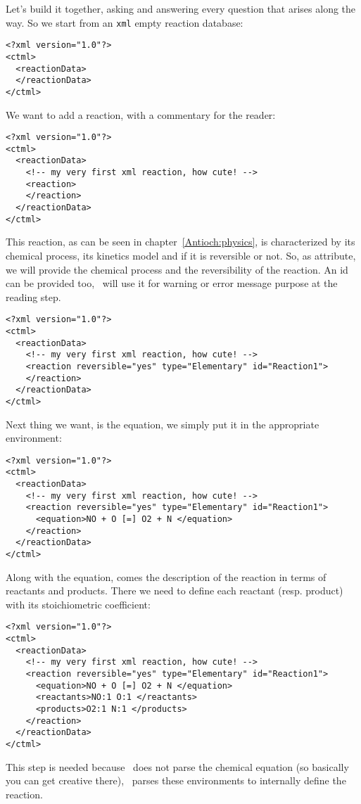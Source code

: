 Let's build it together, asking and answering every question that
arises along the way.
So we start from an \verb!xml! empty reaction database:
%
\begin{verbatim}
<?xml version="1.0"?>
<ctml>
  <reactionData>
  </reactionData>
</ctml>
\end{verbatim}
%
We want to add a reaction, with a commentary for the
reader:
\begin{verbatim}
<?xml version="1.0"?>
<ctml>
  <reactionData>
    <!-- my very first xml reaction, how cute! -->
    <reaction>
    </reaction>
  </reactionData>
</ctml>
\end{verbatim}
This reaction, as can be seen in chapter~\ref{Antioch:physics},
is characterized by its chemical process, its kinetics model and
if it is reversible or not. So, as attribute, we will provide
the chemical process and the reversibility of the reaction. An id
can be provided too, \Antioch\ will use it for warning or error
message purpose at the reading step.
\begin{verbatim}
<?xml version="1.0"?>
<ctml>
  <reactionData>
    <!-- my very first xml reaction, how cute! -->
    <reaction reversible="yes" type="Elementary" id="Reaction1">
    </reaction>
  </reactionData>
</ctml>
\end{verbatim}
Next thing we want, is the equation, we simply put it in the
appropriate environment:
\begin{verbatim}
<?xml version="1.0"?>
<ctml>
  <reactionData>
    <!-- my very first xml reaction, how cute! -->
    <reaction reversible="yes" type="Elementary" id="Reaction1">
      <equation>NO + O [=] O2 + N </equation>
    </reaction>
  </reactionData>
</ctml>
\end{verbatim}
Along with the equation, comes the description of the reaction
in terms of reactants and products. There we need to define
each reactant (resp. product) with its stoichiometric
coefficient:
\begin{verbatim}
<?xml version="1.0"?>
<ctml>
  <reactionData>
    <!-- my very first xml reaction, how cute! -->
    <reaction reversible="yes" type="Elementary" id="Reaction1">
      <equation>NO + O [=] O2 + N </equation>
      <reactants>NO:1 O:1 </reactants>
      <products>O2:1 N:1 </products>
    </reaction>
  </reactionData>
</ctml>
\end{verbatim}
This step is needed because \Antioch\ does not parse the
chemical equation (so basically you can get creative there),
\Antioch\ parses these environments to internally define the
reaction.

